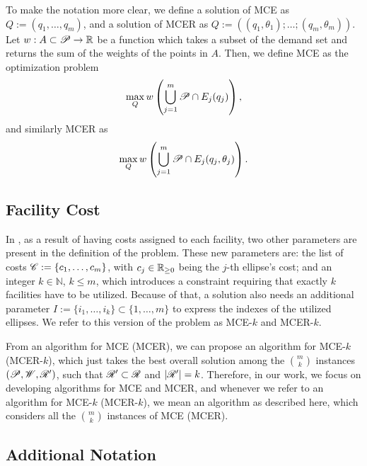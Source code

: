 To make the notation more clear, we define a solution of MCE as $Q:=(q_1, \dots, q_m)$, and a solution of MCER as $Q:=((q_1, \theta_1); \dots; (q_m, \theta_m))$. 
Let $w : A \subset \mathscr{P} \to \mathbb{R}$ be a function which takes a subset of the demand set and returns the sum of the weights of the points in $A$. Then, we define MCE  as the optimization problem 
\begin{equation*}
\max_{Q}  w\left(\bigcup_{j=1}^m\mathscr{P} \cap E_j(q_j)\right),
\end{equation*}
and similarly MCER as
\begin{equation*}
\max_{Q} w\left(\bigcup_{j=1}^m\mathscr{P} \cap E_j(q_j, \theta_j)\right).
\end{equation*}


\subsection{Facility Cost}

In \cite{canbolat, andreta}, as a result of having costs assigned to each facility, two other parameters are present in the definition of the problem.
These new parameters are: the list of costs $\mathscr{C}:=\{c_1, \dots, c_m\}$, with $c_j\in\mathbb{R}_{\ge0}$ being the $j$-th ellipse's cost; 
and an integer $k\in\mathbb{N}$, $k\le m$, which introduces a constraint requiring that exactly $k$ facilities have to be utilized.
Because of that, a solution also needs an additional parameter $I:=\{i_1, \dots, i_k\}\subset\{1, \dots, m\}$ to express the indexes of the utilized ellipses. We refer to this version of the problem as  MCE-$k$ and MCER-$k$.

From an algorithm for MCE (MCER), we can propose an algorithm for MCE-$k$ (MCER-$k$), which just takes the best overall solution among the $\binom{m}{k}$ instances $(\mathscr{P}, \mathscr{W}, \mathscr{R}')$, such that $\mathscr{R}' \subset \mathscr{R}$ and $|\mathscr{R}'| = k$. 
Therefore, in our work, we focus on developing algorithms for MCE and MCER, and whenever we refer to an algorithm for MCE-$k$ (MCER-$k$), we mean an algorithm as described here, which considers all the $\binom{m}{k}$ instances of MCE (MCER).

\subsection{Additional Notation}


